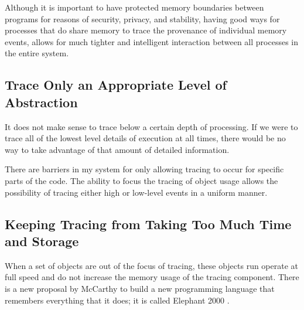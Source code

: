 
Although it is important to have protected memory boundaries between
programs for reasons of security, privacy, and stability, having good
ways for processes that do share memory to trace the provenance of
individual memory events, allows for much tighter and intelligent
interaction between all processes in the entire system.
        

\subsection{Trace Only an Appropriate Level of Abstraction}

It does not make sense to trace below a certain depth of processing.
If we were to trace all of the lowest level details of execution at
all times, there would be no way to take advantage of that amount
of detailed information.

There are barriers in my system for only allowing tracing to occur for
specific parts of the code.  The ability to focus the tracing of object
usage allows the possibility of tracing either high or low-level events
in a uniform manner.

\subsection{Keeping Tracing from Taking Too Much Time and Storage}

When a set of objects are out of the focus of tracing, these objects run
operate at full speed and do not increase the memory usage of the
tracing component.  There is a new proposal by McCarthy to build a new
programming language that remembers everything that it does; it is
called Elephant 2000 \citep{mccarthy:1994}.

